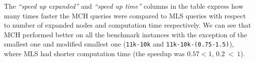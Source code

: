 
The {\em ``speed up expanded''} and {\em ``speed up time''} columns in the table express how many times faster the MCH queries were compared to MLS queries with respect to number of expanded nodes and computation time respectively. We can see that MCH performed better on all the benchmark instances with the exception of the smallest one and modified smallest one ({\tt 11k-10k} and {\tt 11k-10k-(0.75-1.5)}), where MLS had shorter computation time (the speedup was $0.57 < 1$, $0.2~<~1$).


